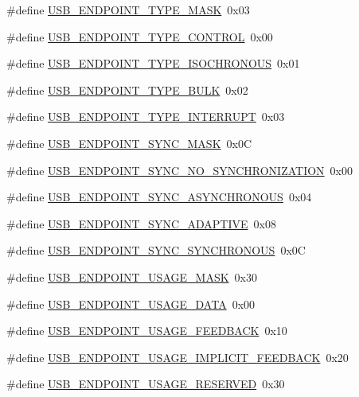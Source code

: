 \begin{DoxyCompactItemize}
\item 
\#define \hyperlink{group__USBD__Core_gacd114fdf068aaa69407358ee5ccfd170}{U\+S\+B\+\_\+\+E\+N\+D\+P\+O\+I\+N\+T\+\_\+\+T\+Y\+P\+E\+\_\+\+M\+A\+SK}~0x03
\item 
\#define \hyperlink{group__USBD__Core_ga6a51ed22b06e5ca0f76a35b6bac8d73a}{U\+S\+B\+\_\+\+E\+N\+D\+P\+O\+I\+N\+T\+\_\+\+T\+Y\+P\+E\+\_\+\+C\+O\+N\+T\+R\+OL}~0x00
\item 
\#define \hyperlink{group__USBD__Core_gab05aae4a5d079b8dfb6a9cb1325ea6e5}{U\+S\+B\+\_\+\+E\+N\+D\+P\+O\+I\+N\+T\+\_\+\+T\+Y\+P\+E\+\_\+\+I\+S\+O\+C\+H\+R\+O\+N\+O\+US}~0x01
\item 
\#define \hyperlink{group__USBD__Core_gaf4bac84d4576dc8f74f39dc75749e3dc}{U\+S\+B\+\_\+\+E\+N\+D\+P\+O\+I\+N\+T\+\_\+\+T\+Y\+P\+E\+\_\+\+B\+U\+LK}~0x02
\item 
\#define \hyperlink{group__USBD__Core_ga2cb5aa69a03df20aab217b808ad692a6}{U\+S\+B\+\_\+\+E\+N\+D\+P\+O\+I\+N\+T\+\_\+\+T\+Y\+P\+E\+\_\+\+I\+N\+T\+E\+R\+R\+U\+PT}~0x03
\item 
\#define \hyperlink{group__USBD__Core_ga91301868eb0b52506fc9bc02b131f783}{U\+S\+B\+\_\+\+E\+N\+D\+P\+O\+I\+N\+T\+\_\+\+S\+Y\+N\+C\+\_\+\+M\+A\+SK}~0x0C
\item 
\#define \hyperlink{group__USBD__Core_ga7733e58f8c4fbcef1533eb02f375aeb0}{U\+S\+B\+\_\+\+E\+N\+D\+P\+O\+I\+N\+T\+\_\+\+S\+Y\+N\+C\+\_\+\+N\+O\+\_\+\+S\+Y\+N\+C\+H\+R\+O\+N\+I\+Z\+A\+T\+I\+ON}~0x00
\item 
\#define \hyperlink{group__USBD__Core_gad1bb5cc537ea61634cb61c8c364c9a6f}{U\+S\+B\+\_\+\+E\+N\+D\+P\+O\+I\+N\+T\+\_\+\+S\+Y\+N\+C\+\_\+\+A\+S\+Y\+N\+C\+H\+R\+O\+N\+O\+US}~0x04
\item 
\#define \hyperlink{group__USBD__Core_gaa7808914116fe45223462e68d6f8aa5d}{U\+S\+B\+\_\+\+E\+N\+D\+P\+O\+I\+N\+T\+\_\+\+S\+Y\+N\+C\+\_\+\+A\+D\+A\+P\+T\+I\+VE}~0x08
\item 
\#define \hyperlink{group__USBD__Core_ga0309c68623fb48fdc621f15dabc579f2}{U\+S\+B\+\_\+\+E\+N\+D\+P\+O\+I\+N\+T\+\_\+\+S\+Y\+N\+C\+\_\+\+S\+Y\+N\+C\+H\+R\+O\+N\+O\+US}~0x0C
\item 
\#define \hyperlink{group__USBD__Core_ga834006343743238a5eb1d273ef3226ae}{U\+S\+B\+\_\+\+E\+N\+D\+P\+O\+I\+N\+T\+\_\+\+U\+S\+A\+G\+E\+\_\+\+M\+A\+SK}~0x30
\item 
\#define \hyperlink{group__USBD__Core_gac852b5e62e4e577b1b43239ae190908a}{U\+S\+B\+\_\+\+E\+N\+D\+P\+O\+I\+N\+T\+\_\+\+U\+S\+A\+G\+E\+\_\+\+D\+A\+TA}~0x00
\item 
\#define \hyperlink{group__USBD__Core_gabe8c89e5b624ac6bb5b9cd2919fc06be}{U\+S\+B\+\_\+\+E\+N\+D\+P\+O\+I\+N\+T\+\_\+\+U\+S\+A\+G\+E\+\_\+\+F\+E\+E\+D\+B\+A\+CK}~0x10
\item 
\#define \hyperlink{group__USBD__Core_gabfdb9f73f34907249b8fd1128c25ae1a}{U\+S\+B\+\_\+\+E\+N\+D\+P\+O\+I\+N\+T\+\_\+\+U\+S\+A\+G\+E\+\_\+\+I\+M\+P\+L\+I\+C\+I\+T\+\_\+\+F\+E\+E\+D\+B\+A\+CK}~0x20
\item 
\#define \hyperlink{group__USBD__Core_ga0ee1319e7242bb61298af850ea64f08a}{U\+S\+B\+\_\+\+E\+N\+D\+P\+O\+I\+N\+T\+\_\+\+U\+S\+A\+G\+E\+\_\+\+R\+E\+S\+E\+R\+V\+ED}~0x30
\end{DoxyCompactItemize}


